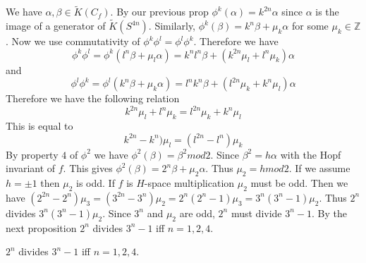 \documentclass[../Thesis.tex]{subfiles}
\begin{document}
\begin{myproof}
We have $\alpha, \beta \in \tilde{K}(C_f)$. By our previous prop $\phi^k(\alpha) = k^{2n}\alpha$ since $\alpha$ is the image of a generator of $\tilde{K}(S^{4n})$. Similarly, $\phi^k(\beta) = k^n\beta + \mu_k \alpha$ for some $\mu_k \in \mathbb{Z}$. Now we use commutativity of $\phi^k\phi^l = \phi^l\phi^k$. Therefore we have
\begin{equation}
\phi^k\phi^l = \phi^k(l^n \beta + \mu_l\alpha) = k^nl^n\beta + (k^{2n}\mu_l + l^n\mu_k)\alpha
\end{equation}
and
\begin{equation}
\phi^l\phi^k = \phi^l(k^n \beta + \mu_k\alpha) = l^nk^n\beta + (l^{2n}\mu_k + k^n\mu_l)\alpha
\end{equation}
Therefore we have the following relation
\begin{equation}
k^{2n}\mu_l + l^n\mu_k = l^{2n}\mu_k + k^n\mu_l
\end{equation}
This is equal to
\begin{equation}
k^{2n} - k^n)\mu_l = (l^{2n}-l^n)\mu_k
\end{equation}
By property $4$ of $\phi^2$ we have $\phi^2(\beta) = \beta^2 mod 2$. Since $\beta^2 = h\alpha$ with the Hopf invariant of $f$. This gives $\phi^2(\beta) = 2^n\beta + \mu_2\alpha$. Thus $\mu_2 = h mod 2$. If we assume $h = \pm 1$ then $\mu_2$ is odd. If $f$ is $H$-space multiplication $\mu_2$ must be odd. Then we have $(2^{2n}-2^n)\mu_3 = (3^{2n} - 3^n)\mu_2 = 2^n(2^n-1)\mu_3 = 3^n(3^n-1)\mu_2$. Thus $2^n$ divides $3^n(3^n-1)\mu_2$. Since $3^n$ and $\mu_2$ are odd, $2^n$ must divide $3^n-1$. By the next proposition $2^n$ divides $3^n-1$ iff $n = 1,2,4$.
\end{myproof}
\begin{prop}
$2^n$ divides $3^n-1$ iff $ n = 1,2 ,4$.
\end{prop}
\end{document}
